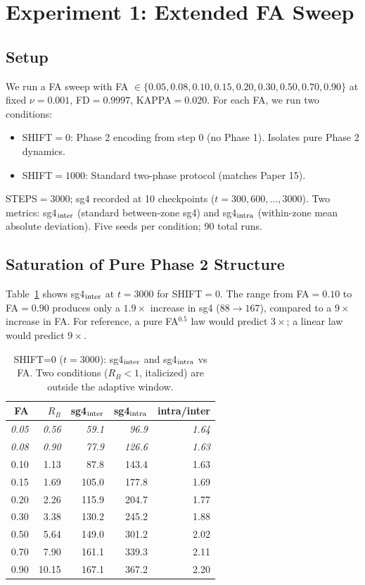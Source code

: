 \documentclass[11pt]{article}
\begin{document}
\section{Experiment 1: Extended FA Sweep}

\subsection{Setup}

We run a FA sweep with FA $\in \{0.05, 0.08, 0.10, 0.15, 0.20, 0.30, 0.50, 0.70, 0.90\}$
at fixed $\nu=0.001$, FD$=0.9997$, KAPPA$=0.020$.
For each FA, we run two conditions:
\begin{itemize}
\item SHIFT$=0$: Phase 2 encoding from step 0 (no Phase 1).
  Isolates pure Phase 2 dynamics.
\item SHIFT$=1000$: Standard two-phase protocol (matches Paper 15).
\end{itemize}
STEPS$=3000$; sg4 recorded at 10 checkpoints ($t=300, 600, \ldots, 3000$).
Two metrics: sg4$_{\rm inter}$ (standard between-zone sg4) and sg4$_{\rm intra}$
(within-zone mean absolute deviation).
Five seeds per condition; 90 total runs.

\subsection{Saturation of Pure Phase 2 Structure}

Table~\ref{tab:sat} shows sg4$_{\rm inter}$ at $t=3000$ for SHIFT$=0$.
The range from FA$=0.10$ to FA$=0.90$ produces only a $1.9\times$ increase
in sg4 ($88 \to 167$), compared to a $9\times$ increase in FA.
For reference, a pure FA$^{0.5}$ law would predict $3\times$; a linear
law would predict $9\times$.

\begin{table}[ht]
\centering
\caption{SHIFT=0 ($t=3000$): sg4$_{\rm inter}$ and sg4$_{\rm intra}$ vs FA.
Two conditions ($R_B < 1$, italicized) are outside the adaptive window.}
\label{tab:sat}
\begin{tabular}{rrrrr}
\toprule
FA & $R_B$ & sg4$_{\rm inter}$ & sg4$_{\rm intra}$ & intra/inter \\
\midrule
\textit{0.05} & \textit{0.56} & \textit{59.1} & \textit{96.9} & \textit{1.64} \\
\textit{0.08} & \textit{0.90} & \textit{77.9} & \textit{126.6} & \textit{1.63} \\
0.10 & 1.13 & 87.8  & 143.4  & 1.63 \\
0.15 & 1.69 & 105.0 & 177.8  & 1.69 \\
0.20 & 2.26 & 115.9 & 204.7  & 1.77 \\
0.30 & 3.38 & 130.2 & 245.2  & 1.88 \\
0.50 & 5.64 & 149.0 & 301.2  & 2.02 \\
0.70 & 7.90 & 161.1 & 339.3  & 2.11 \\
0.90 & 10.15 & 167.1 & 367.2  & 2.20 \\
\bottomrule
\end{tabular}
\end{table}
\end{document}
